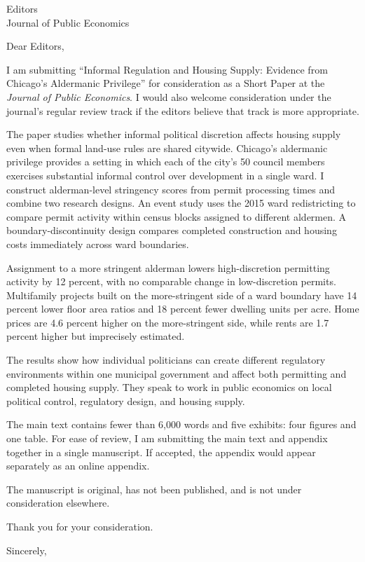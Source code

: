 \documentclass[11pt]{letter}
\begin{document}
\begin{letter}{Editors\\
Journal of Public Economics}

\opening{Dear Editors,}

I am submitting ``Informal Regulation and Housing Supply: Evidence from
Chicago's Aldermanic Privilege'' for consideration as a Short Paper at the
\textit{Journal of Public Economics}. I would also welcome consideration under
the journal's regular review track if the editors believe that track is more
appropriate.

The paper studies whether informal political discretion affects housing supply
even when formal land-use rules are shared citywide. Chicago's aldermanic
privilege provides a setting in which each of the city's 50 council members exercises
substantial informal control over development in a single ward. I construct
alderman-level stringency scores from permit processing times and combine two
research designs. An event study uses the 2015 ward redistricting to compare
permit activity within census blocks assigned to different aldermen. A
boundary-discontinuity design compares completed construction and housing costs
immediately across ward boundaries.

Assignment to a more stringent alderman lowers high-discretion permitting
activity by 12 percent, with no comparable change in low-discretion permits.
Multifamily projects built on the more-stringent side of a ward boundary have
14 percent lower floor area ratios and 18 percent fewer dwelling units per
acre. Home prices are 4.6 percent higher on the more-stringent side, while rents
are 1.7 percent higher but imprecisely estimated.

The results show how individual politicians can create different regulatory
environments within one municipal government and affect both permitting and
completed housing supply. They speak to work in public economics on local
political control, regulatory design, and housing supply.

The main text contains fewer than 6,000 words and five exhibits: four figures
and one table. For ease of review, I am submitting the main text and appendix
together in a single manuscript. If accepted, the appendix would appear
separately as an online appendix.

The manuscript is original, has not been published, and is not under
consideration elsewhere.

Thank you for your consideration.

\closing{Sincerely,}

\end{letter}
\end{document}
